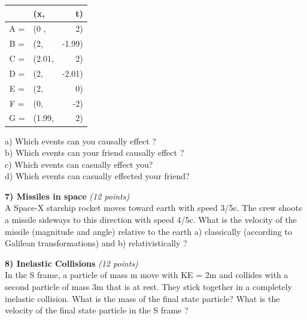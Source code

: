 {\begin{tabular}{clr}
  & (x,& t)\\
  \hline
  A = & (0   , & 2)\\
  B = & (2,    & -1.99)\\
  C = & (2.01, & 2)\\
  D = & (2,    & -2.01)\\
  E = & (2,    & 0)\\
  F = & (0,    & -2)\\
  G = & (1.99, & 2)\\
\end{tabular}

\vspace{0.1in}

a) Which events can you causally effect ?\\

b) Which events can your friend causally effect ?\\

c) Which events can casually effect you?\\

d) Which events can casually effected your friend?

\clearpage

%


\textbf{7) Missiles in space}  \hfill \textit{(12 points)}\\
A Space-X starship rocket moves toward earth with speed 3/5c.
The crew shoots a missile sideways to this direction with speed 4/5c.
What is the velocity of the missile (magnitude and angle) relative to the earth a) classically (according to Galilean transformations) and b) relativistically  ? 

\vfill



\textbf{8) Inelastic Collisions}  \hfill \textit{(12 points)}\\
In the S frame, a particle of mass m move with KE = 2m and collides with a second particle of mass 3m that is at rest.
They stick together in a completely inelastic collision.
What is the mass of the final state particle?
What is the velocity of the final state particle in the S frame ?

}
